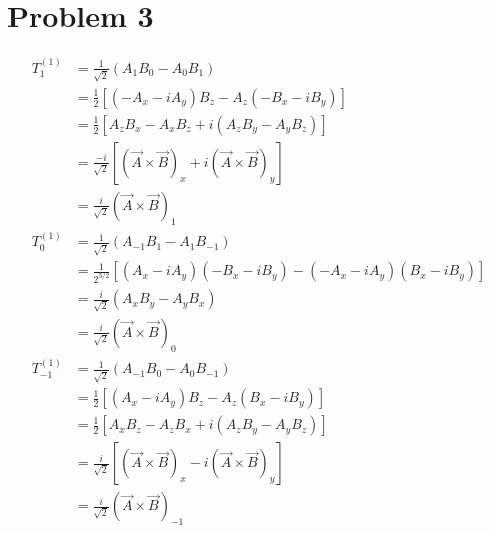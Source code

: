 \documentclass[12pt]{article}
\begin{document}
\section*{Problem 3}
\begin{align*}
    T_1^{(1)}    &= \frac{1}{\sqrt{2}}\left(A_1B_0 - A_0B_1\right) \\
                 &= \frac{1}{2}\left[\left(-A_x-iA_y\right)B_z - A_z\left(-B_x-iB_y\right)\right] \\
                 &= \frac{1}{2} \left[A_zB_x - A_xB_z + i\left(A_zB_y - A_yB_z\right)\right] \\
                 &= \frac{-i}{\sqrt{2}}\left[\left(\vec{A}\times\vec{B}\right)_x + i\left(\vec{A}\times\vec{B}\right)_y\right]  \\
                 &= \frac{i}{\sqrt{2}}\left(\vec{A}\times\vec{B}\right)_1 \\
    T_0^{(1)}    &= \frac{1}{\sqrt{2}}\left(A_{-1}B_1 - A_1B_{-1}\right) \\
                 &= \frac{1}{2^{3/2}}\left[\left(A_x - iA_y\right)\left(-B_x -iB_y\right) - \left(-A_x - iA_y\right)\left(B_x - iB_y\right)\right] \\
                 &= \frac{i}{\sqrt{2}}\left(A_xB_y - A_yB_x\right) \\
                 &= \frac{i}{\sqrt{2}}\left(\vec{A}\times\vec{B}\right)_0 \\
    T_{-1}^{(1)} &= \frac{1}{\sqrt{2}}\left(A_{-1}B_0 - A_0B_{-1}\right) \\
                 &= \frac{1}{2}\left[\left(A_x-iA_y\right)B_z - A_z\left(B_x-iB_y\right)\right] \\
                 &= \frac{1}{2}\left[A_xB_z - A_zB_x + i\left(A_zB_y - A_yB_z\right)\right] \\
                 &= \frac{i}{\sqrt{2}}\left[\left(\vec{A}\times\vec{B}\right)_x - i\left(\vec{A}\times\vec{B}\right)_y\right] \\
                 &= \frac{i}{\sqrt{2}}\left(\vec{A}\times\vec{B}\right)_{-1}
\end{align*}
\end{document}
